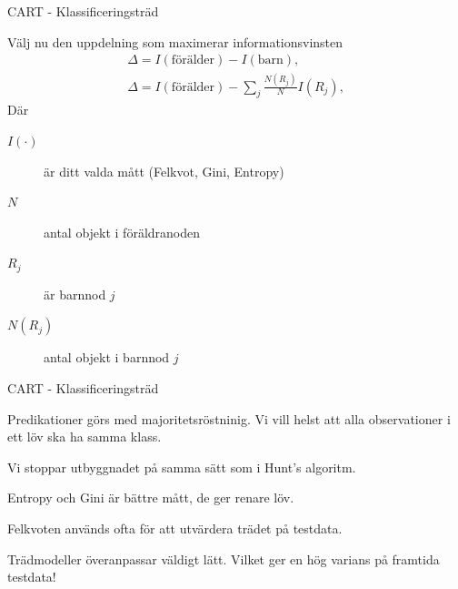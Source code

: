 \documentclass[10pt,english]{beamer}
\begin{document}
\begin{frame}{CART - Klassificeringsträd}

    Välj nu den uppdelning som maximerar informationsvinsten
    \begin{align*}
        \Delta = I(\text{förälder}) - I(\text{barn}), \\
        \Delta = I(\text{förälder}) - \sum_{j} \frac{N(R_j)}{N} I(R_j),
    \end{align*}
    Där
    \begin{description}
        \item[$I(\cdot)$] är ditt valda mått (Felkvot, Gini, Entropy)
        \item[$N$] antal objekt i föräldranoden
        \item[$R_j$] är barnnod $j$
        \item[$N(R_j)$] antal objekt i barnnod $j$    
    \end{description}
    
\end{frame}

\begin{frame}{CART - Klassificeringsträd}

    Predikationer görs med majoritetsröstninig. Vi vill helst att alla observationer i ett löv ska ha samma klass.

    Vi stoppar utbyggnadet på samma sätt som i Hunt's algoritm.

    Entropy och Gini är bättre mått, de ger renare löv.

    Felkvoten används ofta för att utvärdera trädet på testdata.

    Trädmodeller överanpassar väldigt lätt. Vilket ger en hög varians på framtida testdata!
    
\end{frame}
\end{document}
